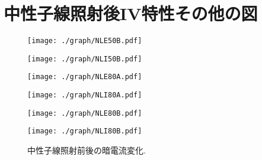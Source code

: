 \section{中性子線照射後IV特性その他の図}
\label{neuN}
\begin{figure}[H]
\begin{minipage}{0.55\hsize}
	\centering
	\texttt{[image: ./graph/NLE50B.pdf]}
\end{minipage}
\begin{minipage}{0.45\hsize}
	\centering
	\texttt{[image: ./graph/NLI50B.pdf]}
\end{minipage}
\begin{minipage}{0.55\hsize}
	\centering
	\texttt{[image: ./graph/NLE80A.pdf]}
\end{minipage}
\begin{minipage}{0.45\hsize}
	\centering
	\texttt{[image: ./graph/NLI80A.pdf]}
\end{minipage}
\begin{minipage}{0.55\hsize}
	\centering
	\texttt{[image: ./graph/NLE80B.pdf]}
\end{minipage}
\begin{minipage}{0.45\hsize}
	\centering
	\texttt{[image: ./graph/NLI80B.pdf]}
\end{minipage}
 	\caption{中性子線照射前後の暗電流変化.}
	\label{fig:neuN}
\end{figure}